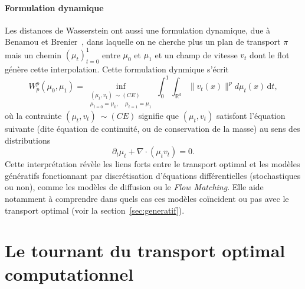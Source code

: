 \documentclass[11pt,a4paper]{article}
\begin{document}
\paragraph{Formulation dynamique}
Les distances de Wasserstein ont aussi une formulation dynamique, due à Benamou et Brenier~\cite{BenamouBrenier2000}, dans laquelle on ne cherche plus un plan de transport $\pi$ mais un chemin $(\mu_t)_{t=0}^1$ entre $\mu_0$ et $\mu_1$ et un champ de vitesse $v_t$ dont le flot génère cette interpolation. 
Cette formulation dynmique s'écrit
\begin{equation}
  W_p^p(\mu_0,\mu_1)
  =
  \inf_{\substack{(\mu_t,v_t)~\sim (CE)\\ \mu_{t=0}=\mu_0,\quad \mu_{t=1}=\mu_1}}
  \int_0^1 \int_{\mathbb{R}^d}
  \|v_t(x)\|^p d\mu_t(x)\,\mathrm{d}t,
  \label{eq:dyn}
\end{equation}
où la contrainte $(\mu_t,v_t)~\sim (CE)$ signifie que $(\mu_t,v_t)$ satisfont l'équation suivante (dite équation de continuité, ou de conservation de la masse) au sens des distributions
\[\partial_t \mu_t + \nabla\!\cdot(\mu_t v_t)=0.\]
Cette interprétation révèle les liens forts entre le transport optimal et les modèles génératifs fonctionnant par discrétisation d'équations différentielles (stochastiques ou non), comme les modèles de diffusion ou le {\em Flow Matching}. Elle aide notamment à comprendre dans quels cas ces modèles coïncident ou pas avec le transport optimal (voir la section~\ref{sec:generatif}). 


\section{Le tournant du transport optimal computationnel}
\end{document}

